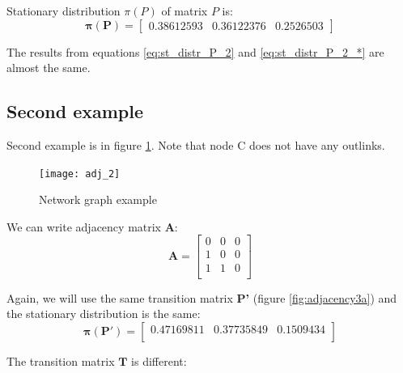 \documentclass{article}
\begin{document}
Stationary distribution $\pi(P)$ of matrix $P$ is:
\begin{equation}
\mathbf{\pi(P)} = 
\begin{bmatrix}
0.38612593 &  0.36122376 & 0.2526503
\end{bmatrix}
\label{eq:st_distr_P_2}
\end{equation}

The results from equations \ref{eq:st_distr_P_2} and \ref{eq:st_distr_P_2_*} are almost the same.

\subsection{Second example}
Second example is in figure  \ref{fig:adj_2}. Note that node C does not have any outlinks. 
\begin{figure}
\centering
\texttt{[image: adj\_2]}
\caption{Network graph example}
\label{fig:adj_2}
\end{figure}

We can write adjacency matrix \textbf{A}:
\[\mathbf{A} = 
\begin{bmatrix}
0  & 0  & 0 \\
1 & 0 & 0 \\
1 & 1 & 0\\
\end{bmatrix}
\]

Again, we will use the same transition matrix \textbf{P'} (figure \ref{fig:adjacency3a}) and the stationary distribution is the same: 
\begin{equation}
\mathbf{\pi(P')} = \begin{bmatrix}
	0.47169811 &  0.37735849 & 0.1509434\\
	\end{bmatrix}
	\label{eq:st_dist_P'_3}
\end{equation}

The transition matrix $\mathbf{T}$ is different:
\end{document}
